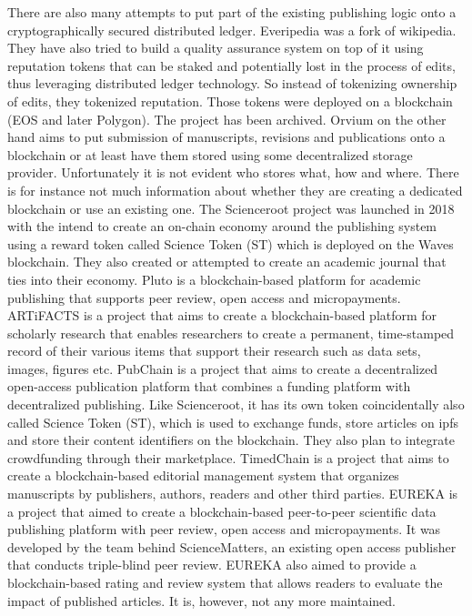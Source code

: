 There are also many attempts to put part of the existing publishing logic onto a cryptographically secured distributed ledger. Everipedia\cite{forselius_everipedia} was a fork of wikipedia. They have also tried to build a quality assurance system on top of it using reputation tokens that can be staked and potentially lost in the process of edits, thus leveraging distributed ledger technology. So instead of tokenizing ownership of edits, they tokenized reputation. Those tokens were deployed on a blockchain (EOS and later Polygon). The project has been archived. Orvium \cite{romero_orvium} on the other hand aims to put submission of manuscripts, revisions and publications onto a blockchain or at least have them stored using some decentralized storage provider. Unfortunately it is not evident who stores what, how and where. There is for instance not much information about whether they are creating a dedicated blockchain or use an existing one.
The Scienceroot project \cite{tintas_scienceroot} was launched in 2018 with the intend to create an on-chain economy around the publishing system using a reward token called Science Token (ST) which is deployed on the Waves blockchain. They also created or attempted to create an academic journal that ties into their economy. Pluto\cite{kang_pluto} is a blockchain-based platform for academic publishing that supports peer review, open access and micropayments. ARTiFACTS\cite{artifacts_team} is a project that aims to create a blockchain-based platform for scholarly research that enables researchers to create a permanent, time-stamped record of their various items that support their research such as data sets, images, figures etc. 
PubChain\cite{pubpub_team} is a project that aims to create a decentralized open-access publication platform that combines a funding platform with decentralized publishing. Like Scienceroot, it has its own token coincidentally also called Science Token (ST), which is used to exchange funds, store articles on ipfs and store their content identifiers on the blockchain. They also plan to integrate crowdfunding through their marketplace. TimedChain \cite{timedchain_team} is a project that aims to create a blockchain-based editorial management system that organizes manuscripts by publishers, authors, readers and other third parties. EUREKA \cite{schaufelbuhl2019eureka} is a project that aimed to create a blockchain-based peer-to-peer scientific data publishing platform with peer review, open access and micropayments. It was developed by the team behind ScienceMatters, an existing open access publisher that conducts triple-blind peer review. EUREKA also aimed to provide a blockchain-based rating and review system that allows readers to evaluate the impact of published articles. It is, however, not any more maintained. 
